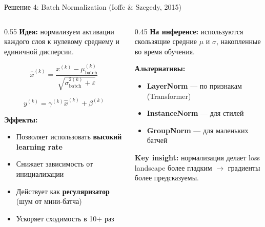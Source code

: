 \documentclass[aspectratio=169, 9pt]{beamer}
\begin{document}
\begin{frame}{Решение 4: Batch Normalization (Ioffe \& Szegedy, 2015)}
  \begin{columns}[T]
    \begin{column}{0.55\textwidth}
      \textbf{Идея:} нормализуем активации каждого слоя к нулевому среднему и единичной дисперсии.
      
      \[
      \hat{x}^{(k)} = \frac{x^{(k)} - \mu_{\text{batch}}^{(k)}}{\sqrt{\sigma_{\text{batch}}^{2(k)} + \varepsilon}}
      \]
      
      \[
      y^{(k)} = \gamma^{(k)} \hat{x}^{(k)} + \beta^{(k)}
      \]
      
      \vspace{0.3em}
      \textbf{Эффекты:}
      \begin{itemize}
        \item Позволяет использовать \textbf{высокий learning rate}
        \item Снижает зависимость от инициализации
        \item Действует как \textbf{регуляризатор} (шум от мини-батча)
        \item Ускоряет сходимость в 10+ раз
      \end{itemize}
    \end{column}
    \begin{column}{0.45\textwidth}
      \textbf{На инференсе:} используются скользящие средние $\mu$ и $\sigma$, накопленные во время обучения.
      
      \vspace{0.5em}
      \textbf{Альтернативы:}
      \begin{itemize}
        \item \textbf{LayerNorm} — по признакам (Transformer)
        \item \textbf{InstanceNorm} — для стилей
        \item \textbf{GroupNorm} — для маленьких батчей
      \end{itemize}
      
      \vspace{0.5em}
      \textcolor{blue!70}{\textbf{Key insight:}} нормализация делает loss landscape более гладким $\to$ градиенты более предсказуемы.
    \end{column}
  \end{columns}
\end{frame}
\end{document}
